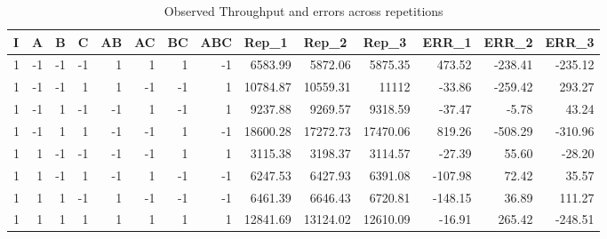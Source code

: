 \documentclass[11pt,a4paper]{article}
\begin{document}
\begin{table}[H]
	\caption{Observed Throughput and errors across repetitions}
	\centering
	\begin{tabular}{|r|r|r|r|r|r|r|r|r|r|r|r|r|r|}
		\hline
		\multicolumn{1}{|l|}{I} & \multicolumn{1}{l|}{A} & \multicolumn{1}{l|}{B} & \multicolumn{1}{l|}{C} & \multicolumn{1}{l|}{AB} & \multicolumn{1}{l|}{AC} & \multicolumn{1}{l|}{BC} & \multicolumn{1}{l|}{ABC} & \multicolumn{1}{l|}{Rep\_1} & \multicolumn{1}{l|}{Rep\_2} & \multicolumn{1}{l|}{Rep\_3} & \multicolumn{1}{l|}{ERR\_1} & \multicolumn{1}{l|}{ERR\_2} & \multicolumn{1}{l|}{ERR\_3} \\ \hline
		1 & -1 & -1 & -1 & 1 & 1 & 1 & -1 & 6583.99 & 5872.06 & 5875.35 & 473.52 & -238.41 & -235.12 \\ \hline
		1 & -1 & -1 & 1 & 1 & -1 & -1 & 1 & 10784.87 & 10559.31 & 11112 & -33.86 & -259.42 & 293.27 \\ \hline
		1 & -1 & 1 & -1 & -1 & 1 & -1 & 1 & 9237.88 & 9269.57 & 9318.59 & -37.47 & -5.78 & 43.24 \\ \hline
		1 & -1 & 1 & 1 & -1 & -1 & 1 & -1 & 18600.28 & 17272.73 & 17470.06 & 819.26 & -508.29 & -310.96 \\ \hline
		1 & 1 & -1 & -1 & -1 & -1 & 1 & 1 & 3115.38 & 3198.37 & 3114.57 & -27.39 & 55.60 & -28.20 \\ \hline
		1 & 1 & -1 & 1 & -1 & 1 & -1 & -1 & 6247.53 & 6427.93 & 6391.08 & -107.98 & 72.42 & 35.57 \\ \hline
		1 & 1 & 1 & -1 & 1 & -1 & -1 & -1 & 6461.39 & 6646.43 & 6720.81 & -148.15 & 36.89 & 111.27 \\ \hline
		1 & 1 & 1 & 1 & 1 & 1 & 1 & 1 & 12841.69 & 13124.02 & 12610.09 & -16.91 & 265.42 & -248.51 \\ \hline
	\end{tabular}
	\label{}
\end{table}
\end{document}
